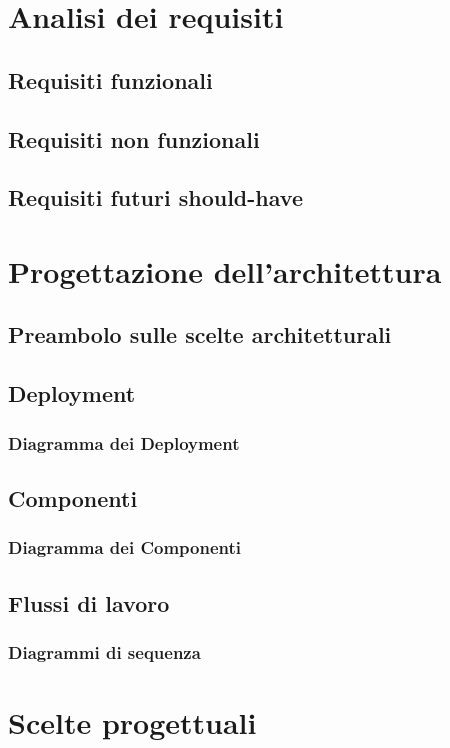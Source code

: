 \documentclass[12pt, a4paper]{article}
\begin{document}
\section{Analisi dei requisiti}
\subsection{Requisiti funzionali}
\subsection{Requisiti non funzionali}
\subsection{Requisiti futuri should-have}

\newpage
\section{Progettazione dell'architettura}
\subsection{Preambolo sulle scelte architetturali}
\subsection{Deployment}
\subsubsection{Diagramma dei Deployment}
\subsection{Componenti}
\subsubsection{Diagramma dei Componenti}
\subsection{Flussi di lavoro}
\subsubsection{Diagrammi di sequenza}

\newpage

\section{Scelte progettuali}
\end{document}
